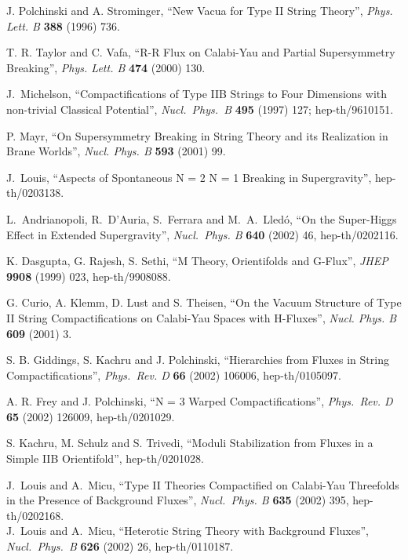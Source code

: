 \documentclass[a4paper,12pt]{article}
\begin{document}
\begin{thebibliography}{99}

J. Polchinski and A. Strominger, ``New Vacua for Type II String
Theory'', {\it Phys.  Lett.  B} {\bf 388} (1996)  736.

T. R. Taylor and C. Vafa, ``R-R Flux on Calabi-Yau and Partial
Supersymmetry Breaking'', {\it Phys. Lett. B} {\bf 474}
(2000) 130.

 J.~Michelson,
``Compactifications of Type IIB Strings to Four Dimensions with non-trivial Classical Potential'',
{\it  Nucl.\ Phys.\ B} {\bf 495} (1997) 127; hep-th/9610151.

P. Mayr, ``On Supersymmetry Breaking in String Theory and its
Realization in Brane Worlds'', {\it Nucl.  Phys.  B} {\bf 593} 
(2001) 99.


 J.~Louis, %
``Aspects of Spontaneous N = 2 \myHighlight{$\to$}\coordHE{} N = 1 Breaking in Supergravity'', hep-th/0203138. 

 L.~Andrianopoli, R.~D'Auria, S.~Ferrara and M.~A.~Lled\'o,
``On the Super-Higgs Effect in Extended Supergravity'', {\it Nucl.\ Phys. B} {\bf 640} (2002) 46,
 hep-th/0202116. 


K. Dasgupta, G. Rajesh, S. Sethi,
``M Theory, Orientifolds and G-Flux'', {\it JHEP} {\bf 9908} (1999)  023, 
hep-th/9908088. 

G. Curio, A. Klemm, D. Lust and S. Theisen, ``On the Vacuum
Structure of Type II String Compactifications on  Calabi-Yau
Spaces with H-Fluxes'', {\it Nucl. Phys. B} {\bf 609} (2001) 3.


 S. B. Giddings, S. Kachru and J. Polchinski,
``Hierarchies from Fluxes in String Compactifications'', {\it Phys.\ Rev. D} {\bf 66} (2002) 106006,
hep-th/0105097.

A. R. Frey and J. Polchinski, ``N = 3 Warped Compactifications'', {\it Phys.\ Rev. D} {\bf 65} (2002) 126009,
hep-th/0201029.


S. Kachru, M. Schulz and S. Trivedi,
 ``Moduli Stabilization from Fluxes in a Simple IIB Orientifold'',
 hep-th/0201028.


 J.~Louis and A.~Micu,
``Type II Theories Compactified on Calabi-Yau Threefolds in the Presence of Background Fluxes'',
{\it Nucl.\ Phys. B} {\bf 635} (2002) 395, hep-th/0202168.\\
J.~Louis and A.~Micu,
``Heterotic String Theory with Background Fluxes'', {\it Nucl.\ Phys.\ B} {\bf 626} (2002) 26, hep-th/0110187.




\end{thebibliography}
\end{document}

